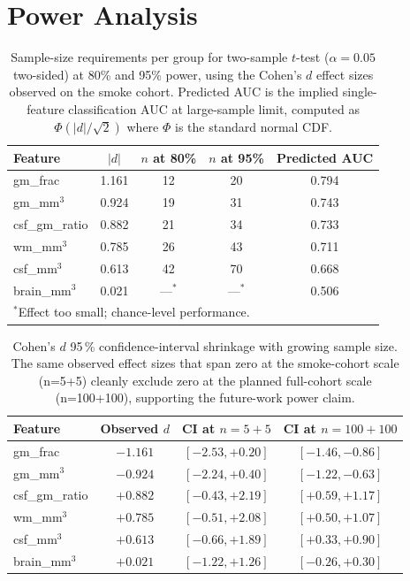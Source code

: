 \documentclass[10pt,a4paper]{article}
\begin{document}
\section{Power Analysis}

\begin{table}[!ht]
\caption{Sample-size requirements per group for two-sample
$t$-test ($\alpha=0.05$ two-sided) at 80\% and 95\% power, using the
Cohen's $d$ effect sizes observed on the smoke cohort. Predicted AUC
is the implied single-feature classification AUC at large-sample
limit, computed as $\Phi(|d|/\sqrt{2})$ where $\Phi$ is the standard
normal CDF.}
\centering
\small
\begin{tabular}{lcccc}
\toprule
Feature & $|d|$ & $n$ at 80\% & $n$ at 95\% & Predicted AUC \\
\midrule
gm\_frac        & 1.161 & 12  &  20 & 0.794 \\
gm\_mm$^3$      & 0.924 & 19  &  31 & 0.743 \\
csf\_gm\_ratio  & 0.882 & 21  &  34 & 0.733 \\
wm\_mm$^3$      & 0.785 & 26  &  43 & 0.711 \\
csf\_mm$^3$     & 0.613 & 42  &  70 & 0.668 \\
brain\_mm$^3$   & 0.021 & ---$^{*}$ & ---$^{*}$ & 0.506 \\
\bottomrule
\multicolumn{5}{l}{\footnotesize $^{*}$Effect too small; chance-level performance.}
\end{tabular}
\end{table}

\begin{table}[!ht]
\caption{Cohen's $d$ 95\,\% confidence-interval shrinkage with
growing sample size. The same observed effect sizes that span zero
at the smoke-cohort scale (n=5+5) cleanly exclude zero at the
planned full-cohort scale (n=100+100), supporting the future-work
power claim.}
\centering
\small
\begin{tabular}{lccc}
\toprule
Feature & Observed $d$ & CI at $n=5+5$ & CI at $n=100+100$ \\
\midrule
gm\_frac        & $-1.161$ & $[-2.53,+0.20]$ & $[-1.46,-0.86]$ \\
gm\_mm$^3$      & $-0.924$ & $[-2.24,+0.40]$ & $[-1.22,-0.63]$ \\
csf\_gm\_ratio  & $+0.882$ & $[-0.43,+2.19]$ & $[+0.59,+1.17]$ \\
wm\_mm$^3$      & $+0.785$ & $[-0.51,+2.08]$ & $[+0.50,+1.07]$ \\
csf\_mm$^3$     & $+0.613$ & $[-0.66,+1.89]$ & $[+0.33,+0.90]$ \\
brain\_mm$^3$   & $+0.021$ & $[-1.22,+1.26]$ & $[-0.26,+0.30]$ \\
\bottomrule
\end{tabular}
\end{table}
\end{document}
